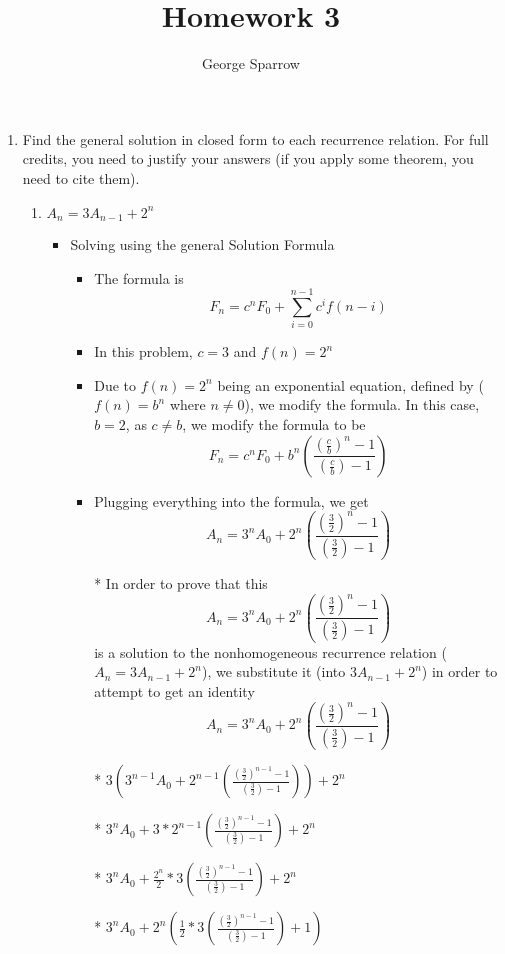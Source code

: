\documentclass{article}
\title{Homework 3}
\date{\mydate}
\author{George Sparrow}
\begin{document}
\maketitle
\newpage

\begin{enumerate}
\item Find the general solution in closed form to each recurrence relation. For full credits, you need to justify your answers (if you apply some theorem, you need to cite them).
  \begin{enumerate}
  \item $A_{n}=3A_{n-1}+2^{n}$
    \begin{itemize} %
    \item Solving using the general Solution Formula
      \begin{itemize} %
      \item The formula is $$F_{n}=c^{n}F_{0} + \sum\limits_{i=0}^{n-1}c^{i}f(n-i)$$
      \item In this problem, $c=3$ and $f(n)=2^{n}$
      \item Due to $f(n)=2^{n}$ being an exponential equation, defined by ($f(n)=b^{n}$ where $n\neq0$), we modify the formula. In this case, $b=2$, as $c\neq b$, we modify the formula to be $$F_{n}=c^{n}F_{0} + b^{n}\left(\frac{(\frac{c}{b})^{n}-1}{(\frac{c}{b})-1}\right)$$
      \item Plugging everything into the formula, we get $$A_{n}=3^{n}A_{0} + 2^{n}\left(\frac{(\frac{3}{2})^{n}-1}{(\frac{3}{2})-1}\right)$$
      \item [*] In order to prove that this $$A_{n}=3^{n}A_{0} + 2^{n}\left(\frac{(\frac{3}{2})^{n}-1}{(\frac{3}{2})-1}\right)$$ is a solution to the nonhomogeneous recurrence relation ($A_{n}=3A_{n-1}+2^{n}$), we substitute it (into $3A_{n-1}+2^{n}$) in order to attempt to get an identity $$A_{n}=3^{n}A_{0} + 2^{n}\left(\frac{(\frac{3}{2})^{n}-1}{(\frac{3}{2})-1}\right)$$
      \item [*] $3\left(3^{n-1}A_{0} + 2^{n-1}\left(\frac{(\frac{3}{2})^{n-1}-1}{(\frac{3}{2})-1}\right)\right)+2^{n}$
      \item [*] $3^{n}A_{0} + 3*2^{n-1}\left(\frac{(\frac{3}{2})^{n-1}-1}{(\frac{3}{2})-1}\right)+2^{n}$
      \item [*] $3^{n}A_{0} + \frac{2^{n}}{2}*3\left(\frac{(\frac{3}{2})^{n-1}-1}{(\frac{3}{2})-1}\right)+2^{n}$
      \item [*] $3^{n}A_{0} + 2^{n} \left(\frac{1}{2}*3\left(\frac{(\frac{3}{2})^{n-1}-1}{(\frac{3}{2})-1}\right)+1\right)$

\end{itemize}
\end{itemize}
\end{enumerate}
\end{enumerate}
\end{document}

